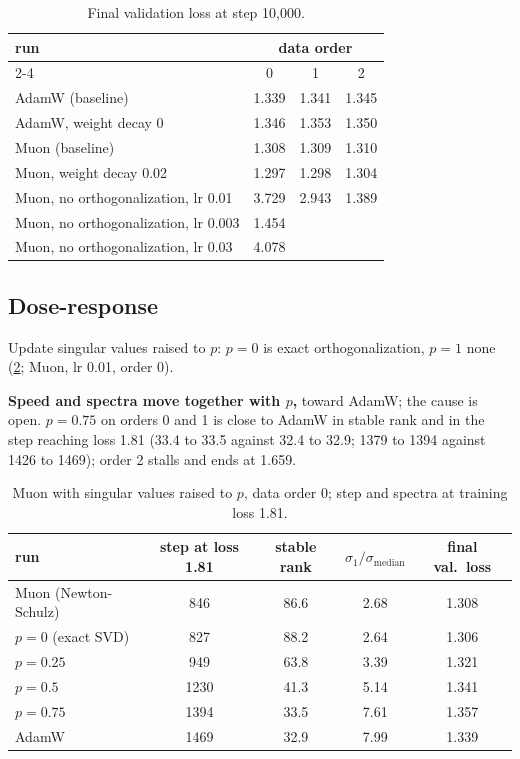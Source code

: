 \documentclass[10pt]{article}
\begin{document}
\begin{table}[H]
\centering
\small
\caption{Final validation loss at step 10{,}000.}
\label{tab:ablate}
\begin{tabular}{l ccc}
\toprule
run & \multicolumn{3}{c}{data order} \\
\cmidrule(lr){2-4}
 & 0 & 1 & 2 \\
\midrule
AdamW (baseline)                 & 1.339 & 1.341 & 1.345 \\
AdamW, weight decay 0            & 1.346 & 1.353 & 1.350 \\
\midrule
Muon (baseline)                  & 1.308 & 1.309 & 1.310 \\
Muon, weight decay 0.02          & 1.297 & 1.298 & 1.304 \\
\midrule
Muon, no orthogonalization, lr 0.01           & 3.729 & 2.943 & 1.389 \\
Muon, no orthogonalization, lr 0.003          & 1.454 &       &       \\
Muon, no orthogonalization, lr 0.03           & 4.078 &       &       \\
\bottomrule
\end{tabular}
\end{table}

\subsection{Dose-response}
\label{sec:dose}

Update singular values raised to $p$: $p=0$ is exact orthogonalization, $p=1$ none (\cref{tab:dose}; Muon, lr 0.01, order 0).

\textbf{Speed and spectra move together with $p$,} toward AdamW; the cause is open. $p=0.75$ on orders 0 and 1 is close to AdamW in stable rank and in the step reaching loss 1.81 (33.4 to 33.5 against 32.4 to 32.9; 1379 to 1394 against 1426 to 1469); order 2 stalls and ends at 1.659.

\begin{table}[H]
\centering
\small
\caption{Muon with singular values raised to $p$, data order 0; step and spectra at training loss 1.81.}
\label{tab:dose}
\begin{tabular}{l cccc}
\toprule
run & step at loss 1.81 & stable rank & $\sigma_1/\sigma_{\mathrm{median}}$ & final val.\ loss \\
\midrule
Muon (Newton-Schulz) & 846  & 86.6 & 2.68 & 1.308 \\
$p=0$ (exact SVD) & 827  & 88.2 & 2.64 & 1.306 \\
$p=0.25$    & 949  & 63.8 & 3.39 & 1.321 \\
$p=0.5$     & 1230 & 41.3 & 5.14 & 1.341 \\
$p=0.75$    & 1394 & 33.5 & 7.61 & 1.357 \\
\midrule
AdamW       & 1469 & 32.9 & 7.99 & 1.339 \\
\bottomrule
\end{tabular}
\end{table}
\end{document}
